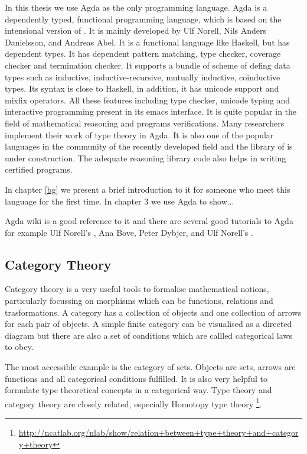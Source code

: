 In this thesis we use Agda as the only programming language. Agda is a dependently typed, functional programming language, which is
based on the intensional version of \mltt. It is mainly developed by
Ulf Norell, Nils Anders Danielsson, and Andreas Abel.
It is a functional language like Haskell, but has dependent types. It has dependent pattern
matching, type checker, coverage checker and termination checker. It
supports a bundle of scheme of defing data types such as inductive, inductive-recursive, mutually inductive,
coinductive types. Its syntax is close to Haskell, in addition, it has
unicode support and mixfix operators. All these features including
type checker, unicode typing and interactive programming present in
its emacs interface. It is quite popular in the field of mathematical reasoning and programs
verifications. Many researchers implement their work of type theory in
Agda. It is also one of the popular languages in the community of the recently
developed field \hott and the library of \hott is under construction.
The adequate reasoning library code also helps in writing certified programs.

In chapter \ref{bg} we present a brief introduction to it for someone
who meet this language for the first time. In chapter 3 we use Agda to
show...

Agda wiki\cite{agdawiki:main} is a good reference to it and there are
several good tutorials to Agda for example Ulf Norell's
\cite{tutorial}, Ana Bove, Peter Dybjer, and Ulf Norell's \cite{bove2009brief}.




\subsection{Category Theory}

Category theory is a very useful tools to formalise mathematical notions, particularly focussing on morphisms which can be functions, relations and trasformations.
A category has a collection of objects and one collection of arrows for each pair of objects. A simple finite category can be visualised as a directed diagram but there are also a set of conditions which are callled categorical laws to obey. 

The most accessible example is the category of sets. Objects are sets, arrows are functions and all categorical conditions fulfilled. It is also very helpful to formulate type theoretical concepts in a categorical way. Type theory and category theory are closely related, especially Homotopy type theory \footnote{\url{http://ncatlab.org/nlab/show/relation+between+type+theory+and+category+theory}}.

